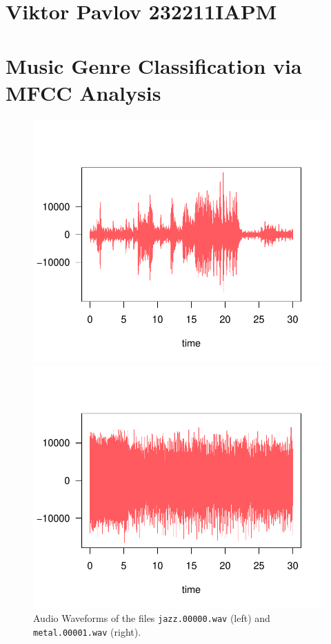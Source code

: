 \documentclass[twocolumn]{article}
\author{Name Surname }
\begin{document}
\section*{Viktor Pavlov 232211IAPM}
\section{Music Genre Classification via MFCC Analysis}
\begin{figure}[htbp]
  \centering
  \begin{minipage}[t]{0.5\columnwidth}
    \centering
    \includegraphics[width=\linewidth]{images/audio_jazz.pdf}
  \end{minipage}\hfill
  \begin{minipage}[t]{0.5\columnwidth}
    \centering
    \includegraphics[width=\linewidth]{images/audio_metal.pdf}
  \end{minipage}
  \caption{Audio Waveforms of the files \texttt{jazz.00000.wav} (left) and \texttt{metal.00001.wav} (right).}
  \label{fig:waves}
\end{figure}
\end{document}

